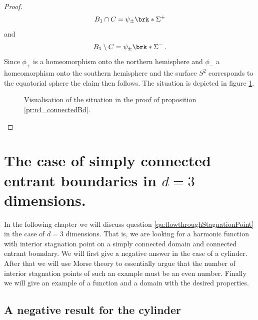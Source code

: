 \begin{proof}
\begin{align*}
    B_1\cap C=\psi_\pm\brk*{\Sigma^+}
  \end{align*}
  and 
  \begin{align*}
    B_1\setminus C=\psi_\pm\brk*{\Sigma^-}\,.
  \end{align*}
  Since $\phi_+$ is a homeomorphism onto the northern hemisphere and
  $\phi_-$ a homeomorphism onto the southern hemisphere and the surface $S^2$
  corresponds to the equatorial sphere the claim then follows.
  The situation is depicted in figure \ref{fi:n4_sigma}.
  \begin{figure}[h]
    \centering
    \def\svgwidth{0.7\textwidth}
    
    \caption{Visualisation of the situation in the proof of proposition \ref{pr:n4_connectedBd}.}
    \label{fi:n4_sigma}
  \end{figure}
\end{proof}



\chapter{The case of simply connected entrant boundaries in $d=3$ dimensions.}

In the following chapter we will discuss question \ref{qu:flowthroughStagnationPoint} in the case of $d=3$ dimensions.
That is, we are looking for a harmonic function with interior stagnation point on a simply connected domain and connected entrant boundary.
We will first give a negative answer in the case of a cylinder.
After that we will use Morse theory to essentially argue that the number of interior stagnation points
of such an example must be an even number.
Finally we will give an example of a function and a domain with the desired properties.

\section{A negative result for the cylinder}

